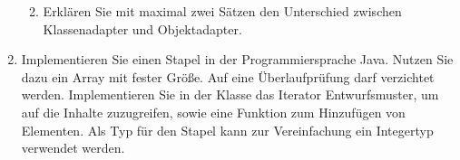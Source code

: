 \documentclass{bschlangaul-aufgabe}
\begin{document}
\begin{enumerate}
\begin{enumerate}
\begin{bAntwort}
\bMetaNochKeineLoesung
\end{bAntwort}


\item Erklären Sie mit maximal zwei Sätzen den Unterschied zwischen
Klassenadapter und
Objektadapter.

\begin{bAntwort}
\bMetaNochKeineLoesung
\end{bAntwort}
\end{enumerate}


\item Implementieren Sie einen Stapel in der Programmiersprache
Java. Nutzen Sie dazu ein Array mit
fester Größe. Auf eine Überlaufprüfung darf verzichtet werden.
Implementieren Sie in der Klasse das Iterator Entwurfsmuster, um auf die
Inhalte zuzugreifen, sowie eine Funktion zum Hinzufügen von Elementen.
Als Typ für den Stapel kann zur Vereinfachung ein Integertyp verwendet
werden.

\begin{bAntwort}
\bMetaNochKeineLoesung
\end{bAntwort}
\end{enumerate}
\end{document}
